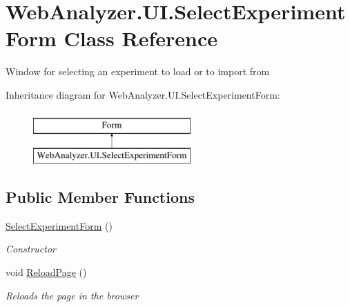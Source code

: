 \hypertarget{class_web_analyzer_1_1_u_i_1_1_select_experiment_form}{}\section{Web\+Analyzer.\+U\+I.\+Select\+Experiment\+Form Class Reference}
\label{class_web_analyzer_1_1_u_i_1_1_select_experiment_form}


Window for selecting an experiment to load or to import from  


Inheritance diagram for Web\+Analyzer.\+U\+I.\+Select\+Experiment\+Form\+:\begin{figure}[H]
\begin{center}
\leavevmode
\includegraphics[height=2.000000cm]{class_web_analyzer_1_1_u_i_1_1_select_experiment_form}
\end{center}
\end{figure}
\subsection*{Public Member Functions}
\begin{DoxyCompactItemize}
\item 
\hyperlink{class_web_analyzer_1_1_u_i_1_1_select_experiment_form_a02acf3f785b0673b34e7a6115d1f8b63}{Select\+Experiment\+Form} ()
\begin{DoxyCompactList}\small\item\em Constructor \end{DoxyCompactList}\item 
void \hyperlink{class_web_analyzer_1_1_u_i_1_1_select_experiment_form_ad75e630924f451b00c681eead2a2412d}{Reload\+Page} ()
\begin{DoxyCompactList}\small\item\em Reloads the page in the browser \end{DoxyCompactList}\end{DoxyCompactItemize}
